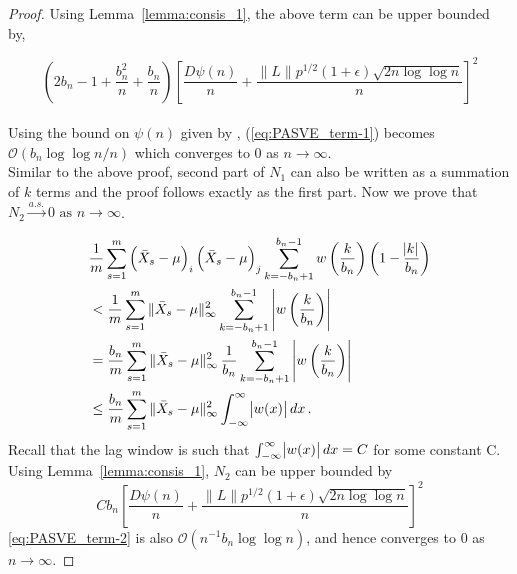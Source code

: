 \documentclass[12pt]{article}
\theoremstyle{remark}
\begin{document}
\begin{proof}
Using Lemma~\ref{lemma:consis_1}, the above term can be upper bounded by,

\begin{equation} \label{eq:PASVE_term-1}
  \left(2b_n - 1 + \dfrac{b_n^2}{n} + \dfrac{b_n}{n}\right)\left[ \dfrac{D \psi(n)}{n} + \dfrac{\|L\| p^{1/2}(1+\epsilon)\sqrt{2n \log\log n}}{n}  \right]^2  
\end{equation}
\\
Using the bound on $\psi(n)$ given by \cite{stra:1964}, (\ref{eq:PASVE_term-1}) becomes $\mathcal{O}\left(b_n \log \log n/n\right)$ which converges to 0 as $n \to \infty$.
\\
Similar to the above proof, second part of $N_1$ can also be written as a summation of $k$ terms and the proof follows exactly as the first part. Now we prove that $N_2 \xrightarrow{a.s.} 0 \textrm{ as } n \to \infty$.

\begin{align*}
    &\dfrac{1}{m} \sum_{s=1}^{m} \left(\bar{X}_s - \mu \right)_i \left(\bar{X}_s - \mu \right)_j\sum_{k=-b_n+1}^{b_n-1}w\left(\dfrac{k}{b_n}\right)\left(1 - \dfrac{\abs{k}}{b_n}\right)\\
    & < \dfrac{1}{m}\sum_{s=1}^{m} \|\bar{X}_s - \mu\|_{\infty}^2 \sum_{k=-b_n+1}^{b_n-1}\left|w\left(\dfrac{k}{b_n}\right)\right|\\
    & = \dfrac{b_n}{m}\sum_{s=1}^{m} \|\bar{X}_s - \mu\|_{\infty}^2\, \dfrac{1}{b_n} \sum_{k=-b_n+1}^{b_n-1}\left|w\left(\dfrac{k}{b_n}\right)\right|\\
    & \leq \dfrac{b_n}{m}\sum_{s=1}^{m} \|\bar{X}_s - \mu\|_{\infty}^2 \int_{-\infty}^{\infty} \abs{w(x)}dx\,.
\end{align*}
Recall that the lag window is such that $\int_{-\infty}^{\infty} \abs{w(x)}dx = C$ for some constant C. Using Lemma~\ref{lemma:consis_1}, $N_2$ can be upper bounded by
%
\begin{equation} \label{eq:PASVE_term-2}
    Cb_n\left[ \dfrac{D \psi(n)}{n} + \dfrac{\|L\| p^{1/2}(1+\epsilon)\sqrt{2n \log\log n}}{n}  \right]^2 
\end{equation}
%
\eqref{eq:PASVE_term-2} is also $\mathcal{O}\left(n^{-1}{b_n \log \log n}\right)$, and hence converges to 0 as $n \to \infty$.
\end{proof}
\end{document}

